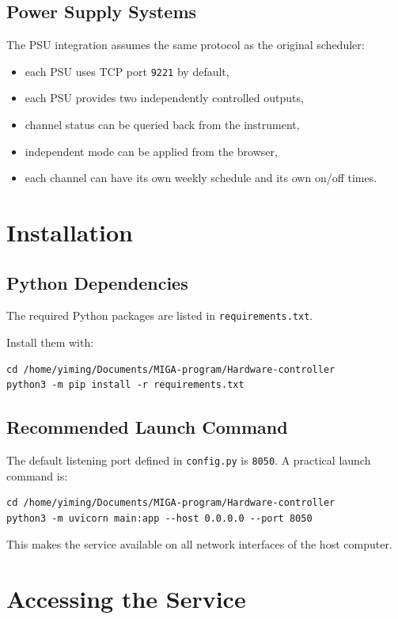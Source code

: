 \documentclass[11pt,a4paper]{article}
\begin{document}
\subsection{Power Supply Systems}
The PSU integration assumes the same protocol as the original scheduler:
\begin{itemize}[leftmargin=1.5em]
    \item each PSU uses TCP port \texttt{9221} by default,
    \item each PSU provides two independently controlled outputs,
    \item channel status can be queried back from the instrument,
    \item independent mode can be applied from the browser,
    \item each channel can have its own weekly schedule and its own on/off times.
\end{itemize}

\section{Installation}
\subsection{Python Dependencies}
The required Python packages are listed in \texttt{requirements.txt}.

Install them with:

\begin{lstlisting}[style=migacode]
cd /home/yiming/Documents/MIGA-program/Hardware-controller
python3 -m pip install -r requirements.txt
\end{lstlisting}

\subsection{Recommended Launch Command}
The default listening port defined in \texttt{config.py} is \texttt{8050}. A practical launch command is:

\begin{lstlisting}[style=migacode]
cd /home/yiming/Documents/MIGA-program/Hardware-controller
python3 -m uvicorn main:app --host 0.0.0.0 --port 8050
\end{lstlisting}

This makes the service available on all network interfaces of the host computer.

\section{Accessing the Service}
\end{document}
